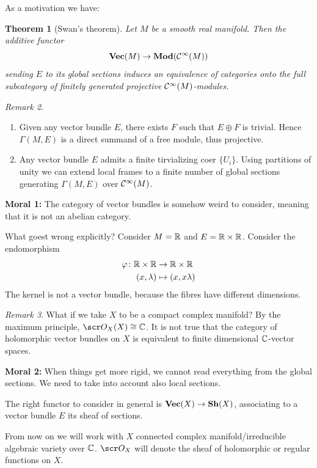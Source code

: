 \documentclass[A4paper, british, reqno]{amsart}
\theoremstyle{darkgreentheorem}
\newtheorem{thm}{Theorem}[section]
\theoremstyle{darkbluedefinition}
\theoremstyle{darkredexample}
\theoremstyle{remark}
\newtheorem{rem}[thm]{Remark}
\newcommand{\1}{\mathbbm{1}}
\newcommand{\op}{\oplus}
\newcommand{\tms}{\times}
\begin{document}
As a motivation we have:

\begin{thm}[Swan's theorem]
    Let $M$ be a smooth real manifold.
    Then the additive functor
    \[ \mathbf{Vec}(M)\to \mathbf{Mod}(\mathcal{C}^{\infty}(M)) \]
    sending $E$ to its global sections induces an equivalence of categories onto the full subcategory of finitely generated projective $\mathcal{C}^{\infty}(M)$-modules.
\end{thm}

\begin{rem}
    \begin{enumerate}
	\item Given any vector bundle $E$, there exists $F$ such that $E\op F$ is trivial.
	    Hence $\Gamma(M,E)$ is a direct summand of a free module, thus projective.
	\item Any vector bundle $E$ admits a finite tirvializing coer $\{U_{i}\}$.
	    Using partitions of unity we can extend local frames to a finite number of global sections generating $\Gamma(M,E)$ over $\mathcal{C}^{\infty}(M)$.
    \end{enumerate}
\end{rem}

\textbf{Moral 1:} The category of vector bundles is somehow weird to consider, meaning that it is not an abelian category.

What goest wrong explicitly? Consider $M=\mathbb{R}$ and $E=\R\tms \R$.
Consider the endomorphism
\begin{align*}
    \varphi\colon\R\tms\R&\to \R\tms \R \\
    (x,\lambda)&\mapsto (x,x\lambda)
\end{align*}
The kernel is not a vector bundle, because the fibres have different dimensions.

\begin{rem}
    What if we take $X$ to be a compact complex manifold?
    By the maximum principle, $\O_{X}(X)\cong \C$.
    It is not true that the category of holomorphic vector bundles on $X$ is equivalent to finite dimensional $\mathbb{C}$-vector spaces.
\end{rem}

\textbf{Moral 2:} When things get more rigid, we cannot read everything from the global sections.
We need to take into account also local sections.

The right functor to consider in general is $\mathbf{Vec}(X)\to \mathbf{Sh}(X)$, associating to a vector bundle $E$ its sheaf of sections.

From now on we will work with $X$ connected complex manifold/irreducible algebraic variety over $\mathbb{C}$.
$\O_{X}$ will denote the sheaf of holomorphic or regular functions on $X$.
\end{document}
